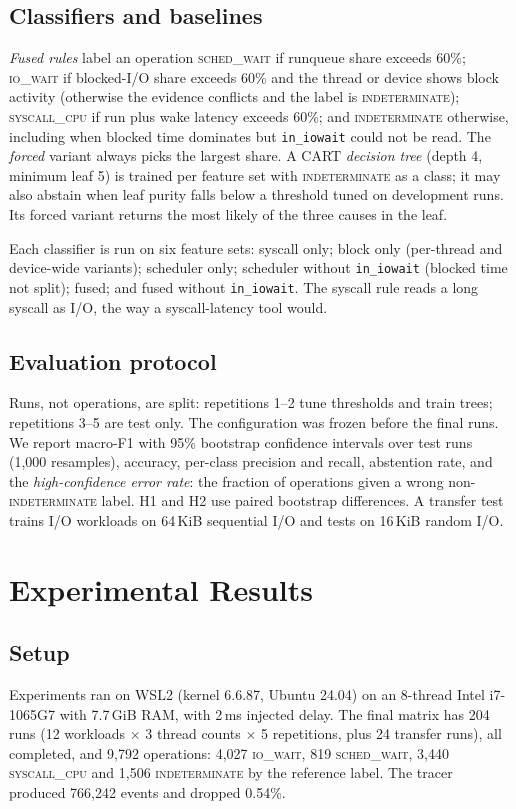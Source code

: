 \documentclass[conference]{IEEEtran}
\newcommand{\lbl}[1]{\textsc{#1}}
\newcommand{\IO}{\lbl{io\_wait}}
\newcommand{\SCHED}{\lbl{sched\_wait}}
\newcommand{\CPU}{\lbl{syscall\_cpu}}
\newcommand{\IND}{\lbl{indeterminate}}
\begin{document}
\subsection{Classifiers and baselines}
\emph{Fused rules} label an operation \SCHED{} if runqueue share exceeds 60\%; \IO{} if blocked-I/O share exceeds 60\% and the thread or device shows block activity (otherwise the evidence conflicts and the label is \IND); \CPU{} if run plus wake latency exceeds 60\%; and \IND{} otherwise, including when blocked time dominates but \texttt{in\_iowait} could not be read. The \emph{forced} variant always picks the largest share. A CART \emph{decision tree} (depth 4, minimum leaf 5) is trained per feature set with \IND{} as a class; it may also abstain when leaf purity falls below a threshold tuned on development runs. Its forced variant returns the most likely of the three causes in the leaf.

Each classifier is run on six feature sets: syscall only; block only (per-thread and device-wide variants); scheduler only; scheduler without \texttt{in\_iowait} (blocked time not split); fused; and fused without \texttt{in\_iowait}. The syscall rule reads a long syscall as I/O, the way a syscall-latency tool would.

\subsection{Evaluation protocol}
Runs, not operations, are split: repetitions 1--2 tune thresholds and train trees; repetitions 3--5 are test only. The configuration was frozen before the final runs. We report macro-F1 with 95\% bootstrap confidence intervals over test runs (1,000 resamples), accuracy, per-class precision and recall, abstention rate, and the \emph{high-confidence error rate}: the fraction of operations given a wrong non-\IND{} label. H1 and H2 use paired bootstrap differences. A transfer test trains I/O workloads on 64\,KiB sequential I/O and tests on 16\,KiB random I/O.

\section{Experimental Results}
\subsection{Setup}
Experiments ran on WSL2 (kernel 6.6.87, Ubuntu 24.04) on an 8-thread Intel i7-1065G7 with 7.7\,GiB RAM, with 2\,ms injected delay. The final matrix has 204 runs (12 workloads $\times$ 3 thread counts $\times$ 5 repetitions, plus 24 transfer runs), all completed, and 9,792 operations: 4,027 \IO, 819 \SCHED, 3,440 \CPU{} and 1,506 \IND{} by the reference label. The tracer produced 766,242 events and dropped 0.54\%.
\end{document}
